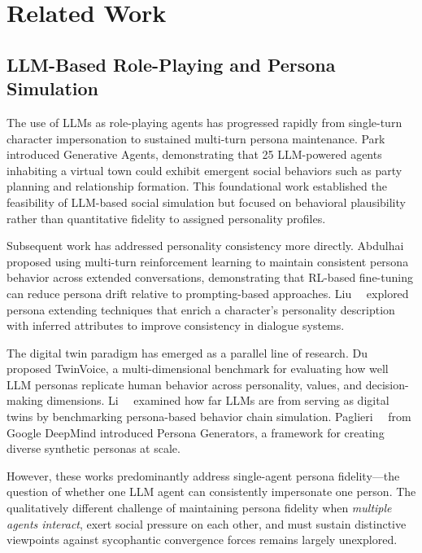 \chapter{Related Work}

\section{LLM-Based Role-Playing and Persona Simulation}

The use of LLMs as role-playing agents has progressed rapidly from single-turn character impersonation to sustained multi-turn persona maintenance. Park~\etal~\cite{park2023generative} introduced Generative Agents, demonstrating that 25 LLM-powered agents inhabiting a virtual town could exhibit emergent social behaviors such as party planning and relationship formation. This foundational work established the feasibility of LLM-based social simulation but focused on behavioral plausibility rather than quantitative fidelity to assigned personality profiles.

Subsequent work has addressed personality consistency more directly. Abdulhai~\etal~\cite{abdulhai2025} proposed using multi-turn reinforcement learning to maintain consistent persona behavior across extended conversations, demonstrating that RL-based fine-tuning can reduce persona drift relative to prompting-based approaches. Liu~\etal~\cite{liu2022extending} explored persona extending techniques that enrich a character's personality description with inferred attributes to improve consistency in dialogue systems.

The digital twin paradigm has emerged as a parallel line of research. Du~\etal~\cite{du2025twinvoice} proposed TwinVoice, a multi-dimensional benchmark for evaluating how well LLM personas replicate human behavior across personality, values, and decision-making dimensions. Li~\etal~\cite{li2025digitaltwin} examined how far LLMs are from serving as digital twins by benchmarking persona-based behavior chain simulation. Paglieri~\etal~\cite{paglieri2026persona} from Google DeepMind introduced Persona Generators, a framework for creating diverse synthetic personas at scale.

However, these works predominantly address single-agent persona fidelity---the question of whether one LLM agent can consistently impersonate one person. The qualitatively different challenge of maintaining persona fidelity when \textit{multiple agents interact}, exert social pressure on each other, and must sustain distinctive viewpoints against sycophantic convergence forces remains largely unexplored.


